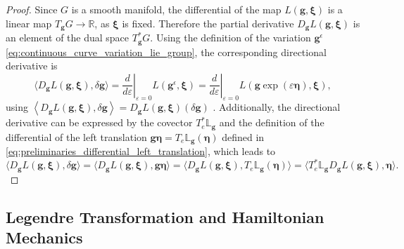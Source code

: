 \begin{proof}
Since $G$ is a smooth manifold, the differential of the map $L(\bm{g},\bm{\xi})$ is a linear map $T_{\bm{g}}G\to\mathbb R$, as $\bm{\xi}$ is fixed. Therefore the partial derivative $D_{\bm{g}}L(\bm{g},\bm{\xi})$ is an element of the dual space $T_{\bm{g}}^*G$. 
Using the definition of the variation $\bm{g}^{\epsilon}$ \eqref{eq:continuous_curve_variation_lie_group}, the corresponding directional derivative is
\[
\langle D_{\bm{g}} L(\bm{g},\bm{\xi}),\delta\bm{g}\rangle
= \left.\frac{d}{d\varepsilon}\right|_{\varepsilon=0}L(\bm{g}^{\epsilon},\bm{\xi})
= \left.\frac{d}{d\varepsilon}\right|_{\varepsilon=0}L(\bm{g}\exp{(\varepsilon \bm{\eta})},\bm{\xi}),
\]
using $\left\langle D_{\bm{g}} L(\bm{g},\bm{\xi}),\delta\bm{g}\right\rangle
=
D_{\bm{g}} L(\bm{g},\bm{\xi})(\delta\bm{g})$ \cite{Lee2008}. Additionally, the directional derivative can be expressed by the covector $T_e^*\mathbb{L}_{\bm{g}}$ and
the definition of the
differential of the left translation $\bm{g}\bm{\eta} = T_e\mathbb{L}_{\bm{g}}(\bm{\eta})$ defined in \eqref{eq:preliminaries_differential_left_translation}, which leads to
\[
\langle D_{\bm{g}} L(\bm{g},\bm{\xi}),\delta\bm{g}\rangle
= \langle D_{\bm{g}} L(\bm{g},\bm{\xi}),\bm{g}\bm{\eta} \rangle
= \langle D_{\bm{g}} L(\bm{g},\bm{\xi}), T_e\mathbb{L}_{\bm{g}}(\bm{\eta}) \rangle
= \langle T_e ^* \mathbb{L}_{\bm{g}} D_{\bm{g}} L(\bm{g},\bm{\xi}), \bm{\eta} \rangle.
\]
\end{proof}

\subsection{Legendre Transformation and Hamiltonian Mechanics}
\label{sec:continuous_legendre_hamiltonian_mechanics}

